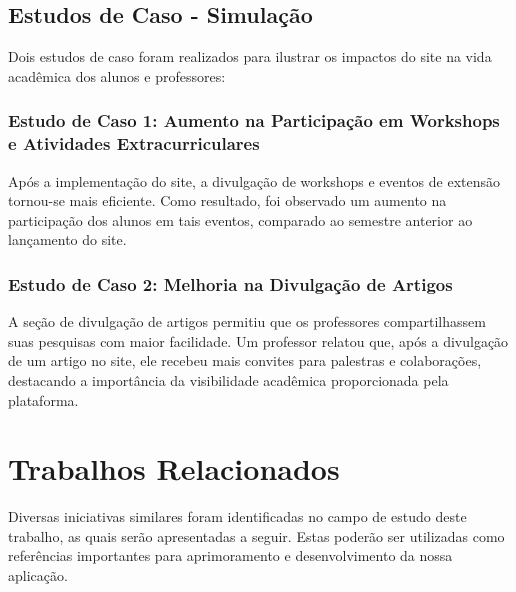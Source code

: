 \documentclass[a4paper,12pt]{report}
\begin{document}
\section{Estudos de Caso - Simulação}
Dois estudos de caso foram realizados para ilustrar os impactos do site na vida acadêmica dos alunos e professores:

\subsection{Estudo de Caso 1: Aumento na Participação em Workshops e Atividades Extracurriculares}
Após a implementação do site, a divulgação de workshops e eventos de extensão tornou-se mais eficiente. Como resultado, foi observado um aumento na participação dos alunos em tais eventos, comparado ao semestre anterior ao lançamento do site.

\subsection{Estudo de Caso 2: Melhoria na Divulgação de Artigos}
A seção de divulgação de artigos permitiu que os professores compartilhassem suas pesquisas com maior facilidade. Um professor relatou que, após a divulgação de um artigo no site, ele recebeu mais convites para palestras e colaborações, destacando a importância da visibilidade acadêmica proporcionada pela plataforma.

\chapter{Trabalhos Relacionados}
Diversas iniciativas similares foram identificadas no campo de estudo deste trabalho, as quais serão apresentadas a seguir. Estas poderão ser utilizadas como referências importantes para aprimoramento e desenvolvimento da nossa aplicação.\
\end{document}
